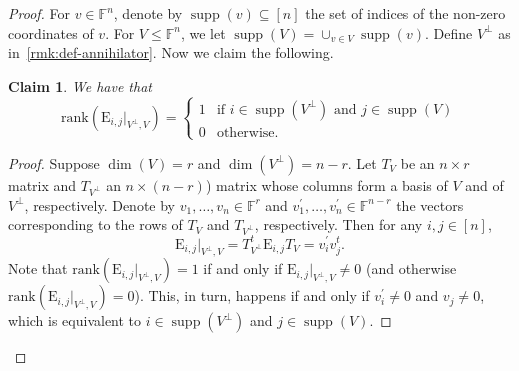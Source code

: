 \documentclass[11pt]{article}
\newtheorem{claim}[theorem]{Claim}
\theoremstyle{plain}
\numberwithin{equation}{section}
\theoremstyle{definition}
\newcommand{\F}{\mathbb{F}}
\newcommand{\rk}{\mathrm{rank}}
\DeclareMathOperator{\supp}{supp}
\newcommand{\E}{\mathrm{E}}
\newcommand{\ann}{V^{\perp}}
\begin{document}
\begin{proof}
    For $v\in\F^n$, denote by $\supp(v)\subseteq[n]$ the set of indices of the non-zero coordinates of $v$. For $V\leq\F^{n}$, we let $\supp(V)=\cup_{v\in V}\supp(v)$. 
    Define $\ann$ as in~\cref{rmk:def-annihilator}. Now we claim the following.
    \begin{claim}\label{claim:rank-Eij}
        We have that
        \[
            \rk(\E_{i,j}|_{\ann,V}) = 
            \begin{cases}
                1&\text{if }i \in \supp(\ann)\text{ and } j \in \supp(V)\\
                0&\text{otherwise.}
            \end{cases}
        \]
    \end{claim}
    \begin{proof}
      Suppose $\dim(V)=r$ and $\dim(\ann)=n-r$. Let
%
%
$T_V$ be an $n\times r$ matrix and $T_{\ann}$ an $n\times (n-r)$) matrix whose
columns form a basis of $V$ and of $\ann$, respectively.  %
      Denote by $v_{1},\dots,v_{n}\in \F^r$ and $v^{\prime}_{1},\dots,v^{\prime}_{n}\in\F^{n-r}$ the vectors corresponding to the rows of $T_V$ and $T_{\ann}$, respectively. Then for any $i,j\in[n]$,
        $$
        \E_{i,j}|_{\ann,V}=T_{\ann}^t\E_{i,j}T_V={v^{\prime}_{i}}v_{j}^{t}.
        $$ 
        Note that $\rk(\E_{i,j}|_{\ann,V})=1$ if and only if $\E_{i,j}|_{\ann,V}\neq0$ (and otherwise $\rk(\E_{i,j}|_{\ann,V})=0$). This, in turn, happens if and only if $v^{\prime}_{i}\neq0$ and $v_{j}\neq0$, which is equivalent to $i\in\supp(\ann)$ and $j\in\supp(V)$. 
    \end{proof}


\end{proof}
\end{document}
